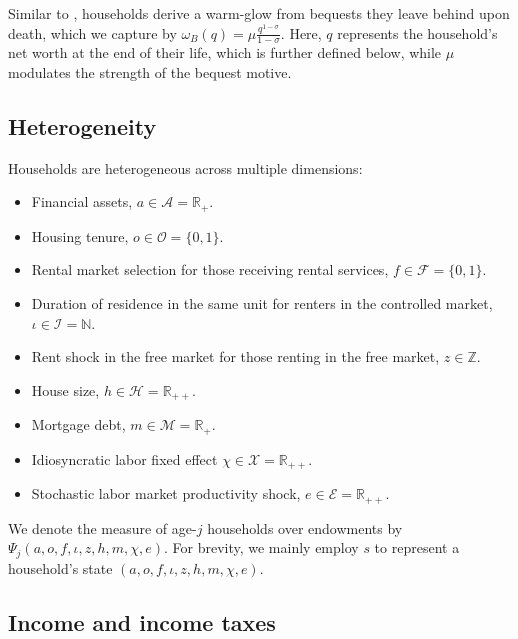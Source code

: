 \documentclass[parskip=full]{article}
\begin{document}
Similar to \citet{cagetti-denardi-2006}, households derive a warm-glow from bequests they leave behind upon death, which we capture by $\omega_{B}(q)=\mu \frac{q^{1-\sigma}}{1-\sigma}$. Here, $q$ represents the household's net worth at the end of their life, which is further defined below, while $\mu$ modulates the strength of the bequest motive.

\subsection{Heterogeneity}

Households are heterogeneous across multiple dimensions:

\begin{itemize}
    \item Financial assets, $a\in \mathcal{A}=\mathbb{R}_{+}$.
    \item Housing tenure, $o \in \mathcal{O}=\{0,1\}$.
    \item Rental market selection for those receiving rental services, $f \in \mathcal{F}=\{0,1\}$.
    \item Duration of residence in the same unit for renters in the controlled market, $\iota \in \mathcal{I}=\mathbb{N}$.
    \item Rent shock in the free market for those renting in the free market, $z \in \mathbb{Z}$.
    \item House size, $h\in \mathcal{H}=\mathbb{R}_{++}$.
    \item Mortgage debt, $m \in \mathcal{M}=\mathbb{R}_{+}$.
    \item Idiosyncratic labor fixed effect $\chi \in \mathcal{X}=\mathbb{R}_{++}$.
    \item Stochastic labor market productivity shock, $e \in \mathcal{E} = \mathbb{R}_{++}$.
\end{itemize}
 
\noindent We denote the measure of age-$j$ households over endowments by $\Psi_{j}(a,o,f,\iota,z,h,m,\chi,e)$. For brevity, we mainly employ $s$ to represent a household's state $(a,o,f,\iota,z,h,m,\chi,e)$.

\subsection{Income and income taxes}\label{subsection:income}
\end{document}
